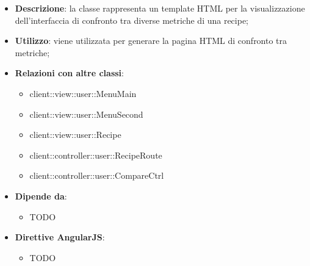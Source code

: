 			\begin{itemize}
				\item \textbf{Descrizione}: la classe rappresenta un template HTML per la visualizzazione dell'interfaccia di confronto tra diverse metriche di una recipe;
				\item \textbf{Utilizzo}: viene utilizzata per generare la pagina HTML di confronto tra metriche;
				\item \textbf{Relazioni con altre classi}:
					\begin{itemize}
						\item client::view::user::MenuMain
						\item client::view::user::MenuSecond
						\item client::view::user::Recipe
						\item client::controller::user::RecipeRoute
						\item client::controller::user::CompareCtrl
					\end{itemize}
				\item \textbf{Dipende da}:
					\begin{itemize}
						\item TODO
					\end{itemize}
				\item \textbf{Direttive AngularJS}:
					\begin{itemize}
						\item TODO
					\end{itemize}
			\end{itemize}

